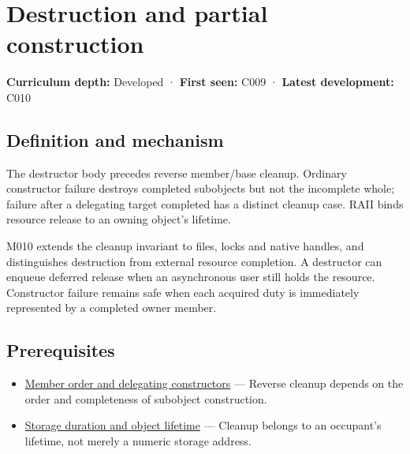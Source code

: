 \hypertarget{appendix-9bfe377cef7a}{}\label{referencestart:appendix-9bfe377cef7a}
\section{Destruction and partial construction}\label{appendix-9bfe377cef7a-destruction-and-partial-construction}

\textbf{Curriculum depth:} Developed · \textbf{First seen:} C009 · \textbf{Latest development:} C010

\begin{allmightroledefinition}

\subsection{Definition and mechanism}\label{appendix-9bfe377cef7a-definition-and-mechanism}

The destructor body precedes reverse member/base cleanup. Ordinary constructor failure destroys completed subobjects but not the incomplete whole; failure after a delegating target completed has a distinct cleanup case. RAII binds resource release to an owning object's lifetime.

\end{allmightroledefinition}

M010 extends the cleanup invariant to files, locks and native handles, and distinguishes destruction from external resource completion. A destructor can enqueue deferred release when an asynchronous user still holds the resource. Constructor failure remains safe when each acquired duty is immediately represented by a completed owner member.

\subsection{Prerequisites}\label{appendix-9bfe377cef7a-prerequisites}

\begin{itemize}
\tightlist
\item
  \hyperref[appendix-3cb49709605a]{Member order and delegating constructors} --- Reverse cleanup depends on the order and completeness of subobject construction.
\item
  \hyperref[appendix-0b104bcba06b]{Storage duration and object lifetime} --- Cleanup belongs to an occupant's lifetime, not merely a numeric storage address.
\end{itemize}

